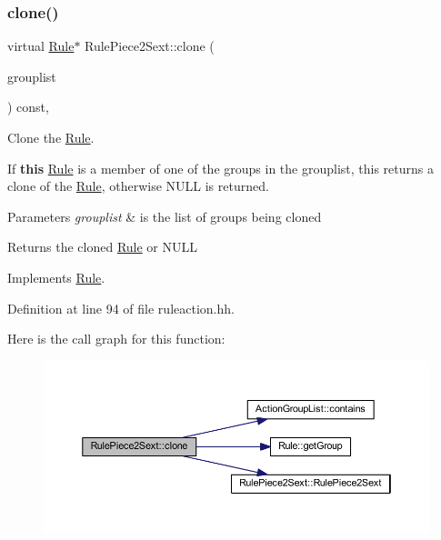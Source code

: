 \subsubsection{\texorpdfstring{clone()}{clone()}}
{\footnotesize\ttfamily virtual \mbox{\hyperlink{class_rule}{Rule}}$\ast$ Rule\+Piece2\+Sext\+::clone (\begin{DoxyParamCaption}\item[{const \mbox{\hyperlink{class_action_group_list}{Action\+Group\+List}} \&}]{grouplist }\end{DoxyParamCaption}) const\hspace{0.3cm}{\ttfamily [inline]}, {\ttfamily [virtual]}}



Clone the \mbox{\hyperlink{class_rule}{Rule}}. 

If {\bfseries{this}} \mbox{\hyperlink{class_rule}{Rule}} is a member of one of the groups in the grouplist, this returns a clone of the \mbox{\hyperlink{class_rule}{Rule}}, otherwise N\+U\+LL is returned. 
\begin{DoxyParams}{Parameters}
{\em grouplist} & is the list of groups being cloned \\
\hline
\end{DoxyParams}
\begin{DoxyReturn}{Returns}
the cloned \mbox{\hyperlink{class_rule}{Rule}} or N\+U\+LL 
\end{DoxyReturn}


Implements \mbox{\hyperlink{class_rule_a70de90a76461bfa7ea0b575ce3c11e4d}{Rule}}.



Definition at line 94 of file ruleaction.\+hh.

Here is the call graph for this function\+:
\nopagebreak
\begin{figure}[H]
\begin{center}
\leavevmode
\includegraphics[width=350pt]{class_rule_piece2_sext_afe4ede287edfde1d4036142f24469728_cgraph}
\end{center}
\end{figure}
\mbox{\label{class_rule_piece2_sext_aadf1e83d42fa92a680d1b3b1ee68fa1e}} 
